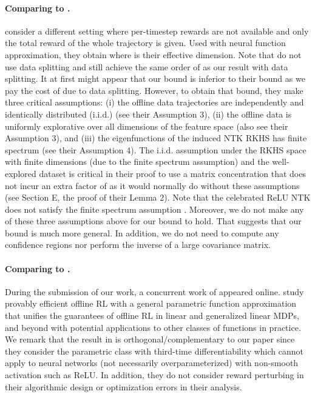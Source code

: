 \documentclass{article} \usepackage{iclr2023/iclr2023_conference,times}
\begin{document}
\paragraph{Comparing to \cite{xu2022provably}.} \citet{xu2022provably} consider a different setting where per-timestep rewards are not available and only the total reward of the whole trajectory is given. Used with neural function approximation, they obtain  where  is their effective dimension. Note that \citet{xu2022provably} do not use data splitting and still achieve the same order of  as our result with data splitting. It at first might appear that our bound is inferior to their bound as we pay the cost of  due to data splitting. However, to obtain that bound, they make three critical assumptions: (i) the offline data trajectories are independently and identically distributed (i.i.d.) (see their Assumption 3), (ii) the offline data is uniformly explorative over all dimensions of the feature space (also see their Assumption 3), and (iii) the eigenfunctions of the induced NTK RKHS has finite spectrum (see their Assumption 4). The i.i.d. assumption under the RKHS space with finite dimensions (due to the finite spectrum assumption) and the well-explored dataset is critical in their proof to use a matrix concentration that does not incur an extra factor of  as it would normally do without these assumptions (see Section E, the proof of their Lemma 2). Note that the celebrated ReLU NTK does not satisfy the finite spectrum assumption \citep{bietti2019inductive}. Moreover, we do not make any of these three assumptions above for our bound to hold. That suggests that our bound is much more general. In addition, we do not need to compute any confidence regions nor perform the inverse of a large covariance matrix. 

\paragraph{Comparing to \cite{yin2022offline}.} During the submission of our work, a concurrent work of \cite{yin2022offline} appeared online. \citet{yin2022offline} study provably efficient offline RL with a general parametric function approximation that unifies the guarantees of offline RL in linear and generalized linear MDPs, and beyond with potential applications to other classes of functions in practice. We remark that the result in \cite{yin2022offline} is orthogonal/complementary to our paper since they consider the parametric class with third-time differentiability which cannot apply to neural networks (not necessarily overparameterized) with non-smooth activation such as ReLU. In addition, they do not consider reward perturbing in their algorithmic design or optimization errors in their analysis. 
\end{document}
